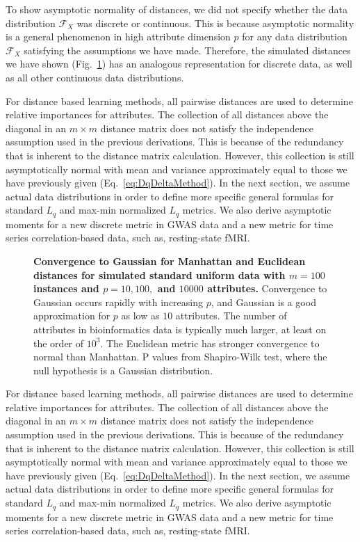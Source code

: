 \documentclass[10pt,letterpaper]{article}
\begin{document}
To show asymptotic normality of distances, we did not specify whether the data distribution $\mathcal{F}_X$ was discrete or continuous. This is because asymptotic normality is a general phenomenon in high attribute dimension $p$ for any data distribution $\mathcal{F}_X$ satisfying the assumptions we have made. Therefore, the simulated distances we have shown (Fig.~\ref{fig:central_limit_convergence}) has an analogous representation for discrete data, as well as all other continuous data distributions.

For distance based learning methods, all pairwise distances are used to determine relative importances for attributes. The collection of all distances above the diagonal in an $m \times m$ distance matrix does not satisfy the independence assumption used in the previous derivations. This is because of the redundancy that is inherent to the distance matrix calculation. However, this collection is still asymptotically normal with mean and variance approximately equal to those we have previously given (Eq.~\ref{eq:DqDeltaMethod}). In the next section, we assume actual data distributions in order to define more specific general formulas for standard $L_q$ and max-min normalized $L_q$ metrics. We also derive asymptotic moments for a new discrete metric in GWAS data and a new metric for time series correlation-based data, such as, resting-state fMRI.

\begin{figure}[H]
	\centering
	\caption{{\bf Convergence to Gaussian for Manhattan and Euclidean distances for simulated standard uniform data with $m=100$ instances and $p=10, 100,$ and $10000$ attributes.} Convergence to Gaussian occurs rapidly with increasing $p$, and Gaussian is a good approximation for $p$ as low as $10$ attributes. The number of attributes in bioinformatics data is typically much larger, at least on the order of $10^3$. The Euclidean metric has stronger convergence to normal than Manhattan.  P values from Shapiro-Wilk test, where the null hypothesis is a Gaussian distribution.}
	\label{fig:central_limit_convergence}
\end{figure}

For distance based learning methods, all pairwise distances are used to determine relative importances for attributes. The collection of all distances above the diagonal in an $m \times m$ distance matrix does not satisfy the independence assumption used in the previous derivations. This is because of the redundancy that is inherent to the distance matrix calculation. However, this collection is still asymptotically normal with mean and variance approximately equal to those we have previously given (Eq.~\ref{eq:DqDeltaMethod}). In the next section, we assume actual data distributions in order to define more specific general formulas for standard $L_q$ and max-min normalized $L_q$ metrics. We also derive asymptotic moments for a new discrete metric in GWAS data and a new metric for time series correlation-based data, such as, resting-state fMRI.
\end{document}
